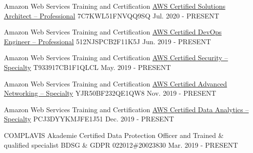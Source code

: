 

\begin{cventries}

  \cventry
    {Amazon Web Services Training and Certification}
    {\href{https://www.youracclaim.com/badges/e00de02f-620b-41b5-8ad7-3caaa7993bc9}{AWS Certified Solutions Architect – Professional}}
    {7C7KWL51FNVQQ9SQ}
    {Jul. 2020 - PRESENT}
    {}

\cventry
    {Amazon Web Services Training and Certification}
    {\href{https://www.youracclaim.com/badges/47430bb9-b9ea-4927-97af-c79b3a9c6d04}{AWS Certified DevOps Engineer – Professional}}
    {512NJSPCB2F11K5J}
    {Jun. 2019 - PRESENT}
    {}

\cventry
    {Amazon Web Services Training and Certification}
    {\href{https://www.youracclaim.com/badges/2cd78cd7-189d-41cd-ac59-535b65cef3f9}{AWS Certified Security – Specialty}}
    {T933917CB1F1QLCL}
    {May. 2019 - PRESENT}
    {}

\cventry
    {Amazon Web Services Training and Certification}
    {\href{https://www.youracclaim.com/badges/1eada9e9-bdeb-4bcc-b056-5519c722a312}{AWS Certified Advanced Networking – Specialty}}
    {YJR50BF232QE1QW8}
    {Nov. 2019 - PRESENT}
    {}

\cventry
    {Amazon Web Services Training and Certification}
    {\href{https://www.youracclaim.com/badges/ea88e1a0-800e-4d98-b116-a9614a40966c}{AWS Certified Data Analytics – Specialty}}
    {PCJ3DYYKMJFE1J51}
    {Dec. 2019 - PRESENT}
    {}

\cventry
    {COMPLAVIS Akademie}
    {Certified Data Protection Officer and Trained \& qualified specialist BDSG \& GDPR}
    {022012\#20023830}
    {Mar. 2019 - PRESENT}
    {}

\end{cventries}
